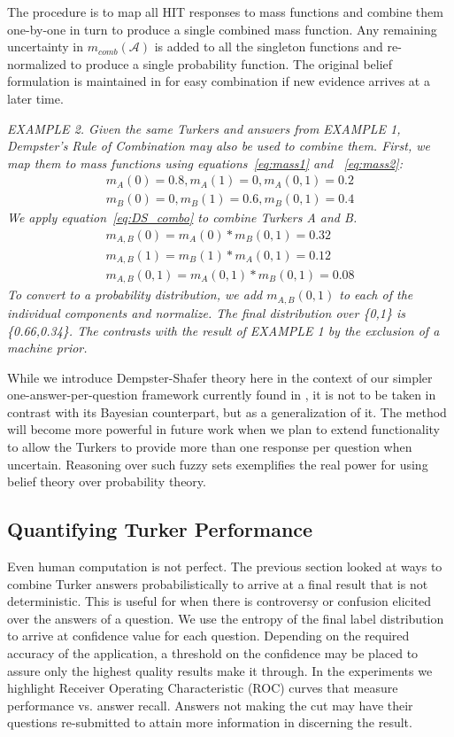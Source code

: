 The procedure is to map all HIT responses to mass functions and combine them one-by-one in turn to produce a single combined mass function.  Any remaining uncertainty in $m_{comb}(\mathcal{A})$ is added to all the singleton functions and re-normalized to produce a single probability function.  The original belief formulation is maintained in \sysName for easy combination if new evidence arrives at a later time.

\textit{
EXAMPLE 2. Given the same Turkers and answers from EXAMPLE 1, Dempster's Rule of Combination may also be used to combine them.  First, we map them to mass functions using equations~\ref{eq:mass1} and ~\ref{eq:mass2}:
\begin{align}
m_{A}(0) = 0.8,  m_{A}(1) = 0,  m_{A}(0,1) = 0.2\nonumber\\
m_{B}(0) = 0,  m_{B}(1) = 0.6,  m_{B}(0,1) = 0.4
\end{align}
We apply equation~\ref{eq:DS_combo} to combine Turkers A and B.
\begin{align}
m_{A,B}(0) = m_{A}(0)*m_{B}(0,1) = 0.32\nonumber\\
m_{A,B}(1) = m_{B}(1)*m_{A}(0,1) = 0.12\nonumber\\
m_{A,B}(0,1) = m_{A}(0,1)*m_{B}(0,1) = 0.08
\end{align}
To convert to a probability distribution, we add $m_{A,B}(0,1)$ to each of the individual components and normalize.  The final distribution over \{0,1\} is \{0.66,0.34\}.  The contrasts with the result of EXAMPLE 1 by the exclusion of a machine prior.
}

While we introduce Dempster-Shafer theory here in the context of our simpler one-answer-per-question framework currently found in \sysName , it is not to be taken in contrast with its Bayesian counterpart, but as a generalization of it.  The method will become more powerful in future work when we plan to extend functionality to allow the Turkers to provide more than one response per question when uncertain.  Reasoning over such fuzzy sets exemplifies the real power for using belief theory over probability theory.

\subsection{Quantifying Turker Performance}

Even human computation is not perfect.  The previous section looked at ways to combine Turker answers probabilistically to arrive at a final result that is not deterministic.  This is useful for when there is controversy or confusion elicited over the answers of a question.  We use the entropy of the final label distribution to arrive at confidence value for each question.  Depending on the required accuracy of the application, a threshold on the confidence may be placed to assure only the highest quality results make it through.  In the experiments we highlight Receiver Operating Characteristic (ROC) curves that measure performance vs. answer recall.  Answers not making the cut may have their questions re-submitted to attain more information in discerning the result. 

